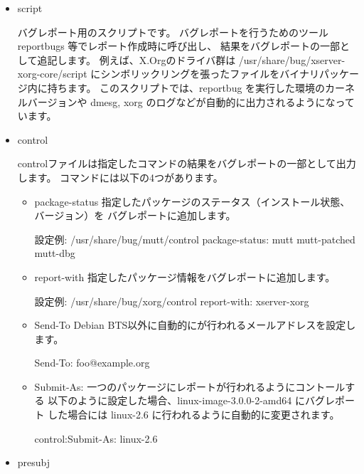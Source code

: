 \documentclass[mingoth,a4paper]{jsarticle}
\begin{document}
\begin{itemize}
\item script

バグレポート用のスクリプトです。
バグレポートを行うためのツールreportbugs 等でレポート作成時に呼び出し、
結果をバグレポートの一部として追記します。
例えば、X.Orgのドライバ群は /usr/share/bug/xserver-xorg-core/script
にシンボリックリングを張ったファイルをバイナリパッケージ内に持ちます。
このスクリプトでは、reportbug を実行した環境のカーネルバージョンや
dmesg, xorg のログなどが自動的に出力されるようになっています。

\item control

controlファイルは指定したコマンドの結果をバグレポートの一部として出力します。
コマンドには以下の4つがあります。

\begin{itemize}
\item package-status
指定したパッケージのステータス（インストール状態、バージョン）を
バグレポートに追加します。

\begin{commandline}
設定例:
/usr/share/bug/mutt/control package-status: mutt mutt-patched mutt-dbg
\end{commandline}

\item report-with
指定したパッケージ情報をバグレポートに追加します。

\begin{commandline}
設定例:
/usr/share/bug/xorg/control report-with: xserver-xorg
\end{commandline}

\item Send-To
Debian BTS以外に自動的にが行われるメールアドレスを設定します。

\begin{commandline}
Send-To: foo@example.org
\end{commandline}

\item Submit-As:
一つのパッケージにレポートが行われるようにコントールする
以下のように設定した場合、linux-image-3.0.0-2-amd64 にバグレポート
した場合には linux-2.6 に行われるように自動的に変更されます。

\begin{commandline}
control:Submit-As: linux-2.6
\end{commandline}
\end{itemize}

\item presubj


\end{itemize}
\end{document}
